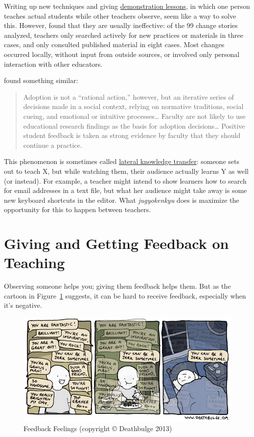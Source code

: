 Writing up new techniques and giving \protect\hyperlink{g:demonstration-lesson}{demonstration
lessons}, in which one person teaches actual
students while other teachers observe, seem like a way to solve
this. However, \cite{Finc2007,Finc2012} found that they
are usually ineffective: of the 99 change stories analyzed, teachers
only searched actively for new practices or materials in three cases,
and only consulted published material in eight cases. Most changes
occurred locally, without input from outside sources, or involved only
personal interaction with other educators.

\cite{Bark2015} found something similar:

\begin{quote}\setlength{\parindent}{0pt}
Adoption is not a ``rational action,'' however, but an iterative series
of decisions made in a social context, relying on normative
traditions, social cueing, and emotional or intuitive
processes\ldots{} Faculty are not likely to use educational
research findings as the basis for adoption decisions\ldots{}
Positive student feedback is taken as strong evidence by faculty that
they should continue a practice.
\end{quote}

This phenomenon is sometimes called \protect\hyperlink{g:lateral-knowledge-transfer}{lateral knowledge
transfer}: someone sets out to teach X,
but while watching them, their audience actually learns Y as well (or
instead). For example, a teacher might intend to show learners how to
search for email addresses in a text file, but what her audience might
take away is some new keyboard shortcuts in the editor. What
\emph{jugyokenkyu} does is maximize the opportunity for this to happen
between teachers.

\section{Giving and Getting Feedback on Teaching}\label{s:performance-feedback}

Observing someone helps you; giving them feedback helps them. But as the
cartoon in Figure~\ref{f:performance-feedback-feelings} suggests, it can
be hard to receive feedback, especially when it's negative.

\begin{figure}
\centering
\includegraphics{../../figures/deathbulge-jerk.jpg}
\caption{Feedback Feelings (copyright © Deathbulge 2013)}
\label{f:performance-feedback-feelings}
\end{figure}

